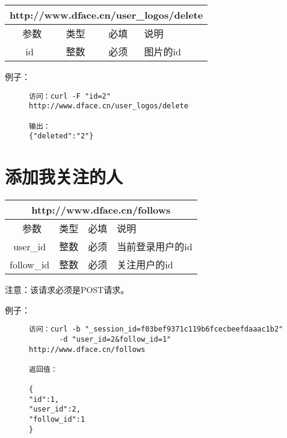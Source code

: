 \documentclass[cs4size]{ctexartutf8}
\begin{document}
\begin{table}[H]
   \begin{center}
\begin{tabular}{|c|c|c|p{12cm}|}
\hline
\multicolumn{4}{|c|}{http://www.dface.cn/user\_logos/delete} \\
\hline\hline
 \  参数  & 类型 & 必填 &  说明  \\
\hline
 id  & 整数 & 必须 &  图片的id\\
\hline
\end{tabular}
   \end{center}
\end{table}

例子：

\begin{figure}[H]
\begin{verbatim}
访问：curl -F "id=2" 
http://www.dface.cn/user_logos/delete

输出：
{"deleted":"2"}

\end{verbatim}
\end{figure}



\section{添加我关注的人}

\begin{table}[H]
   \begin{center}
\begin{tabular}{|c|c|c|p{12cm}|}
\hline
\multicolumn{4}{|c|}{http://www.dface.cn/follows} \\
\hline\hline
 \  参数  & 类型 & 必填 &  说明  \\
\hline
 user\_id  & 整数 & 必须 &  当前登录用户的id\\
\hline
 follow\_id  & 整数 & 必须 &  关注用户的id\\
\hline
\end{tabular}
   \end{center}
\end{table}

注意：该请求必须是POST请求。

例子：

\begin{figure}[H]
\begin{verbatim}
访问：curl -b "_session_id=f03bef9371c119b6fcecbeefdaaac1b2"
       -d "user_id=2&follow_id=1" http://www.dface.cn/follows

返回值：

{
"id":1,
"user_id":2,
"follow_id":1
}

\end{verbatim}
\end{figure}
\end{document}
